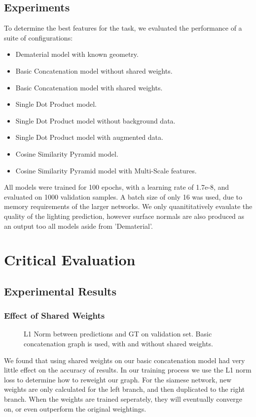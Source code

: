 \documentclass[ %
                    author={Gavin Parker},
                supervisor={Dr. Neill Campbell},
                    degree={MEng},
                     title={Deep Siamese Networks for Illumination Estimation from Stereo Images},
                  subtitle={},
                      type={research},
                      year={2018} ]{dissertation}
\begin{document}
\section{Experiments}
To determine the best features for the task, we evaluated the performance of a suite of configurations:
\begin{itemize}
\item Dematerial model with known geometry.
\item Basic Concatenation model without shared weights.
\item Basic Concatenation model with shared weights.
\item Single Dot Product model.
\item Single Dot Product model without background data.
\item Single Dot Product model with augmented data.
\item Cosine Similarity Pyramid model.
\item Cosine Similarity Pyramid model with Multi-Scale features.
\end{itemize}
All models were trained for 100 epochs, with a learning rate of 1.7e-8, and evaluated on 1000 validation samples. A batch size of only 16 was used, due to memory requirements of the larger networks. We only quanititatively evaulate the quality of the lighting prediction, however surface normals are also produced as an output too all models aside from 'Dematerial'.
\chapter{Critical Evaluation}
\label{chap:evaluation}
\section{Experimental Results}
\subsection{Effect of Shared Weights}
\begin{figure}[H]
\newlength\figureheight
\newlength\figurewidth
\setlength\figureheight{6cm}
\setlength\figurewidth{12cm}
\centering

\caption{L1 Norm between predictions and GT on validation set. Basic concatenation graph is used, with and without shared weights.}
\end{figure}
We found that using shared weights on our basic concatenation model had very little effect on the accuracy of results. In our training process we use the L1 norm loss to determine how to reweight our graph. For the siamese network, new weights are only calculated for the left branch, and then duplicated to the right branch. When the weights are trained seperately, they will eventually converge on, or even outperform the original weightings.
\end{document}

